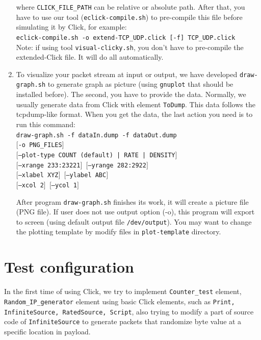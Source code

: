 \documentclass[a4paper]{article}
\begin{document}
\begin{enumerate}
  where \texttt{CLICK\_FILE\_PATH} can be relative or absolute path. After that, you have to use our tool (\texttt{eclick-compile.sh}) to pre-compile this file before simulating it by Click, for example:\\
    \texttt{eclick-compile.sh -o extend-TCP\_UDP.click [-f] TCP\_UDP.click}\\
Note: if using tool \texttt{visual-clicky.sh}, you don't have to pre-compile the extended-Click file. It will do all automatically.
        \item To visualize your packet stream at input or output, we have developed \texttt{draw-graph.sh} to generate graph as picture (using \texttt{gnuplot} that should be installed before). The second, you have to provide the data. Normally, we usually generate data from Click with element \texttt{ToDump}. This data follows the tcpdump-like format. When you get the data, the last action you need is to run this command:\\
\texttt{draw-graph.sh -f dataIn.dump -f dataOut.dump \\
      $[$-o PNG\_FILES$]$\\
      $[$--plot-type COUNT (default) | RATE | DENSITY$]$\\
      $[$--xrange 233:23221$]$  $[$--yrange 282:2922$]$\\
      $[$--xlabel XYZ$]$  $[$--ylabel ABC$]$\\
      $[$--xcol 2$]$  $[$--ycol 1$]$}
      
  After program \texttt{draw-graph.sh} finishes its work, it will create a picture file (PNG file). If user does not use output option (-o), this program will export to screen (using default output file \texttt{/dev/output}). You may want to change the plotting template by modify files in \texttt{plot-template} directory.
      \end{enumerate}
  \section{Test configuration}
  In the first time of using Click, we try to implement \texttt{Counter\_test} element, \texttt{Random\_IP\_generator} element using basic Click elements, such as \texttt{Print, InfiniteSource, RatedSource, Script}, also trying to modify a part of source code of \texttt{InfiniteSource} to generate packets that randomize byte value at a specific location in payload.
\end{document}
